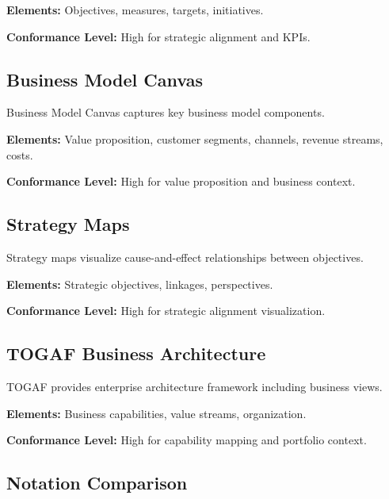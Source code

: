 \documentclass[11pt,letterpaper]{article}
\begin{document}
\textbf{Elements:} Objectives, measures, targets, initiatives.

\textbf{Conformance Level:} High for strategic alignment and KPIs.

\subsection{Business Model Canvas}

Business Model Canvas captures key business model components.

\textbf{Elements:} Value proposition, customer segments, channels, revenue streams, costs.

\textbf{Conformance Level:} High for value proposition and business context.

\subsection{Strategy Maps}

Strategy maps visualize cause-and-effect relationships between objectives.

\textbf{Elements:} Strategic objectives, linkages, perspectives.

\textbf{Conformance Level:} High for strategic alignment visualization.

\subsection{TOGAF Business Architecture}

TOGAF provides enterprise architecture framework including business views.

\textbf{Elements:} Business capabilities, value streams, organization.

\textbf{Conformance Level:} High for capability mapping and portfolio context.

\subsection{Notation Comparison}
\end{document}
